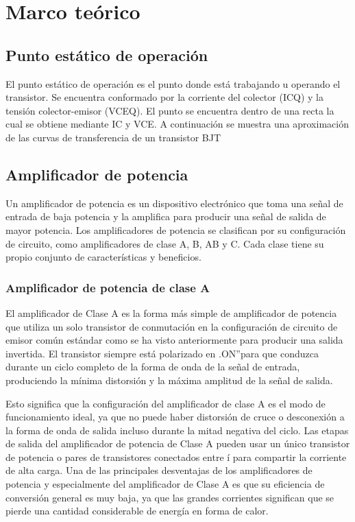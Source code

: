 \section{Marco teórico}

\subsection{Punto estático de operación}

El punto estático de operación es el punto donde está trabajando u operando el transistor. Se encuentra
conformado por la corriente del colector (ICQ) y la tensión colector-emisor (VCEQ). El punto se encuentra dentro de una recta la
cual se obtiene mediante IC y VCE. A continuación se muestra una aproximación de las curvas de transferencia de un transistor
BJT

\subsection{Amplificador de potencia}
Un amplificador de potencia es un dispositivo electrónico que toma una señal de entrada de baja potencia y la amplifica
para producir una señal de salida de mayor potencia. Los amplificadores de potencia se clasifican por su configuración de circuito,
como amplificadores de clase A, B, AB y C. Cada clase tiene su propio conjunto de características y beneficios.

\subsubsection{Amplificador de potencia de clase A}

El amplificador de Clase A es la forma más simple de amplificador de potencia que
utiliza un solo transistor de conmutación en la configuración de circuito de emisor común
estándar como se ha visto anteriormente para producir una salida invertida. El transistor
siempre está polarizado en .ON”para que conduzca durante un ciclo completo de la forma
de onda de la señal de entrada, produciendo la mínima distorsión y la máxima amplitud de
la señal de salida.

Esto significa que la configuración del amplificador de clase A es el modo de funcionamiento ideal, ya que no puede haber distorsión de cruce o desconexión a la forma de onda
de salida incluso durante la mitad negativa del ciclo. Las etapas de salida del amplificador
de potencia de Clase A pueden usar un único transistor de potencia o pares de transistores
conectados entre í para compartir la corriente de alta carga. Una de las principales desventajas de los amplificadores de potencia y especialmente del amplificador de Clase A es
que su eficiencia de conversión general es muy baja, ya que las grandes corrientes significan
que se pierde una cantidad considerable de energía en forma de calor.

